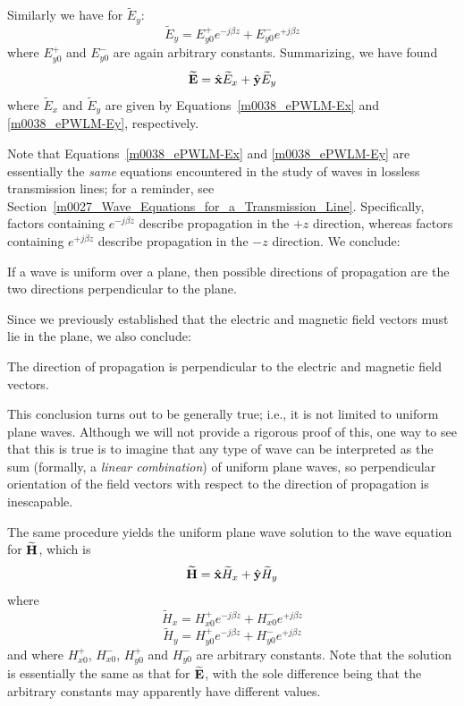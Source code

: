 Similarly we have for $\widetilde{E}_y$:
%
\begin{equation}
\widetilde{E}_y = E_{y0}^+ e^{-j\beta z} + E_{y0}^- e^{+j\beta z}
\label{m0038_ePWLM-Ey} 
\end{equation}
%
where $E_{y0}^+$ and $E_{y0}^-$ are again arbitrary constants.  
Summarizing, we have found
%
\begin{equation}
\widetilde{\bf E} = \hat{\bf x}\widetilde{E}_x + \hat{\bf y}\widetilde{E}_y 
\end{equation}
%
where $\widetilde{E}_x$ and $\widetilde{E}_y$ are given by Equations~\ref{m0038_ePWLM-Ex} and \ref{m0038_ePWLM-Ey}, respectively.

Note that Equations~\ref{m0038_ePWLM-Ex} and \ref{m0038_ePWLM-Ey} are essentially the \emph{same} equations encountered in the study of waves in lossless transmission lines; for a reminder, see Section~\ref{m0027_Wave_Equations_for_a_Transmission_Line}.  Specifically, factors containing $e^{-j\beta z}$ describe propagation in the $+z$ direction, whereas factors containing $e^{+j\beta z}$ describe propagation in the $-z$ direction.  We conclude:
%
\begin{mdframed}[backgroundcolor=yellow!20,nobreak=true] 
If a wave is uniform over a plane, then possible directions of propagation are the two directions perpendicular to the plane. 
\end{mdframed}
%
Since we previously established that the electric and magnetic field vectors must lie in the plane, we also conclude:
%
\begin{mdframed}[backgroundcolor=yellow!20,nobreak=true] 
The direction of propagation is perpendicular to the electric and magnetic field vectors.
\end{mdframed}
%
This conclusion turns out to be generally true; i.e., it is not limited to uniform plane waves.  
Although we will not provide a rigorous proof of this, one way to see that this is true is to imagine that any type of wave can be interpreted as the sum (formally, a \emph{linear combination}) of uniform plane waves, so perpendicular orientation of the field vectors with respect to the direction of propagation is inescapable.  

The same procedure yields the uniform plane wave solution to the wave equation for $\widetilde{\bf H}$, which is
%
\begin{equation}
\widetilde{\bf H} = \hat{\bf x}\widetilde{H}_x + \hat{\bf y}\widetilde{H}_y 
\end{equation}
%
where
%
\begin{equation}
\widetilde{H}_x = H_{x0}^+ e^{-j\beta z} + H_{x0}^- e^{+j\beta z}
\label{m0038_ePWLM-Hx} 
\end{equation}
%
\begin{equation}
\widetilde{H}_y = H_{y0}^+ e^{-j\beta z} + H_{y0}^- e^{+j\beta z}
\label{m0038_ePWLM-Hy} 
\end{equation}
%
and where $H_{x0}^+$, $H_{x0}^-$, $H_{y0}^+$ and $H_{y0}^-$ are arbitrary constants.
Note that the solution is essentially the same as that for $\widetilde{\bf E}$, with the sole difference being that the arbitrary constants may apparently have different values. 

